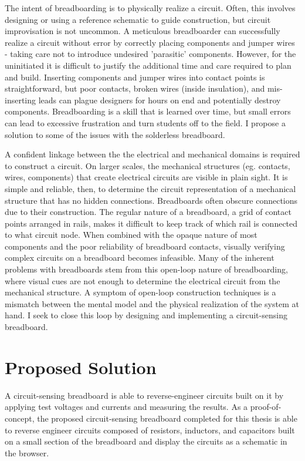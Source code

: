 The intent of breadboarding is to physically realize a circuit.
Often, this involves designing or using a reference schematic to guide construction, but circuit improvisation is not uncommon.  
A meticulous breadboarder can successfully realize a circuit without error by correctly placing components and jumper wires - taking care not to introduce undesired 'parasitic' components.  
However, for the uninitiated it is difficult to justify the additional time and care required to plan and build.
Inserting components and jumper wires into contact points is straightforward, but poor contacts, broken wires (inside insulation), and mis-inserting leads can plague designers for hours on end and potentially destroy components.
Breadboarding is a skill that is learned over time, but small errors can lead to excessive frustration and turn students off to the field.
I propose a solution to some of the issues with the solderless breadboard.

A confident linkage between the the electrical and mechanical domains is required to construct a circuit.
On larger scales, the mechanical structures (eg. contacts, wires, components) that create electrical circuits are visible in plain sight.
It is simple and reliable, then, to determine the circuit representation of a mechanical structure that has no hidden connections.
Breadboards often obscure connections due to their construction.
The regular nature of a breadboard, a grid of contact points arranged in rails, makes it difficult to keep track of which rail is connected to what circuit node.
When combined with the opaque nature of most components and the poor reliability of breadboard contacts, visually verifying complex circuits on a breadboard becomes infeasible.
Many of the inherent problems with breadboards stem from this open-loop nature of breadboarding, where visual cues are not enough to determine the electrical circuit from the mechanical structure.
A symptom of open-loop construction techniques is a mismatch between the mental model and the physical realization of the system at hand.
I seek to close this loop by designing and implementing a circuit-sensing breadboard.

\section{Proposed Solution}

A circuit-sensing breadboard is able to reverse-engineer circuits built on it by applying test voltages and currents and measuring the results.  
As a proof-of-concept, the proposed circuit-sensing breadboard completed for this thesis is able to reverse engineer circuits composed of resistors, inductors, and capacitors built on a small section of the breadboard and display the circuits as a schematic in the browser.

